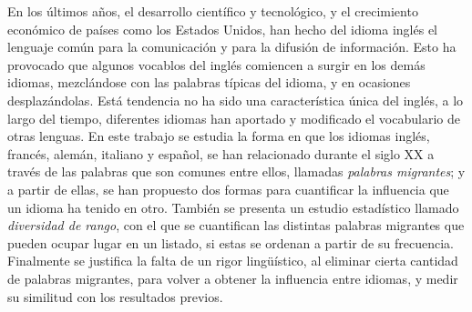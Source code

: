 
\begin{abstracts}        

En los últimos años, el desarrollo científico y tecnológico,  y el crecimiento económico de países como los Estados Unidos,  han hecho del idioma inglés el lenguaje común para la comunicación y para la difusión de información. Esto ha provocado que algunos vocablos del inglés comiencen a surgir en los demás idiomas,  mezclándose con las palabras típicas del idioma, y en ocasiones desplazándolas. Está tendencia no ha sido una característica única del inglés, a lo largo del tiempo, diferentes idiomas han aportado y modificado el vocabulario de otras lenguas. En este trabajo se estudia la forma en que los idiomas inglés, francés, alemán, italiano y español, se han relacionado durante el siglo XX a través de las palabras que son comunes entre ellos, llamadas  \textit{palabras migrantes};  y a partir de ellas, se han propuesto dos formas para cuantificar la influencia que un idioma ha tenido en otro. También se presenta un estudio estadístico llamado \textit{diversidad de rango}, con el que se cuantifican las distintas palabras migrantes que pueden ocupar lugar en un listado, si estas se ordenan  a partir de su frecuencia.  Finalmente se justifica la falta de un rigor lingüístico, al eliminar cierta cantidad de palabras migrantes, para volver a obtener la influencia entre idiomas, y medir su similitud con los resultados previos. 



 
\end{abstracts}


